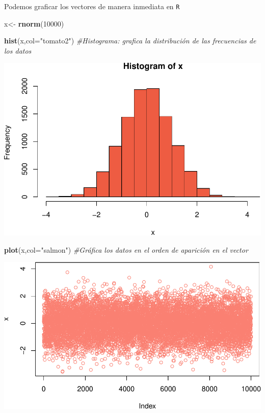 \documentclass[
]{book}
\newenvironment{Shaded}{\begin{snugshade}}{\end{snugshade}}
\newcommand{\AttributeTok}[1]{\textcolor[rgb]{0.13,0.29,0.53}{#1}}
\newcommand{\CommentTok}[1]{\textcolor[rgb]{0.56,0.35,0.01}{\textit{#1}}}
\newcommand{\DecValTok}[1]{\textcolor[rgb]{0.00,0.00,0.81}{#1}}
\newcommand{\FunctionTok}[1]{\textcolor[rgb]{0.13,0.29,0.53}{\textbf{#1}}}
\newcommand{\NormalTok}[1]{#1}
\newcommand{\OtherTok}[1]{\textcolor[rgb]{0.56,0.35,0.01}{#1}}
\newcommand{\StringTok}[1]{\textcolor[rgb]{0.31,0.60,0.02}{#1}}
\begin{document}
Podemos graficar los vectores de manera inmediata en \texttt{R}

\begin{Shaded}
\begin{Highlighting}[]
\NormalTok{x}\OtherTok{\textless{}{-}} \FunctionTok{rnorm}\NormalTok{(}\DecValTok{10000}\NormalTok{)}

\FunctionTok{hist}\NormalTok{(x,}\AttributeTok{col=}\StringTok{"tomato2"}\NormalTok{) }\CommentTok{\#Histograma: grafica la distribución de las frecuencias de los datos }
\end{Highlighting}
\end{Shaded}

\includegraphics{bookdown-demo_files/figure-latex/unnamed-chunk-76-1.pdf}

\begin{Shaded}
\begin{Highlighting}[]
\FunctionTok{plot}\NormalTok{(x,}\AttributeTok{col=}\StringTok{"salmon"}\NormalTok{) }\CommentTok{\#Gráfica los datos en el orden de aparición en el vector }
\end{Highlighting}
\end{Shaded}

\includegraphics{bookdown-demo_files/figure-latex/unnamed-chunk-76-2.pdf}
\end{document}
